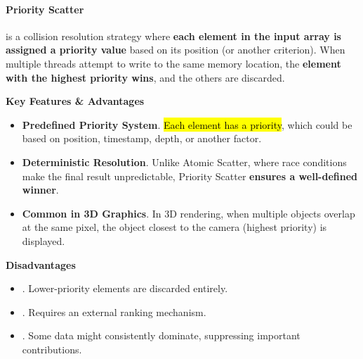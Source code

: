 \paragraph{Priority Scatter}

 is a collision resolution strategy where \textbf{each element in the input array is assigned a priority value} based on its position (or another criterion). When multiple threads attempt to write to the same memory location, the \textbf{element with the highest priority wins}, and the others are discarded.

\highspace
\begin{flushleft}
    \textcolor{Green3}{ \textbf{Key Features \& Advantages}}
\end{flushleft}
\begin{itemize}
    \item \textbf{Predefined Priority System}. \hl{Each element has a priority}, which could be based on position, timestamp, depth, or another factor.

    \item[\textcolor{Green3}{\faIcon{check}}] \textcolor{Green3}{\textbf{Deterministic Resolution}}. Unlike Atomic Scatter, where race conditions make the final result unpredictable, Priority Scatter \textbf{ensures a well-defined winner}.
    
    \item[\textcolor{Green3}{\faIcon{check}}] \textcolor{Green3}{\textbf{Common in 3D Graphics}}. In 3D rendering, when multiple objects overlap at the same pixel, the object closest to the camera (highest priority) is displayed.
\end{itemize}

\highspace
\begin{flushleft}
    \textcolor{Red2}{ \textbf{Disadvantages}}
\end{flushleft}
\begin{itemize}[label=\textcolor{Red2}{}]
    \item {}. Lower-priority elements are discarded entirely.
    \item {}. Requires an external ranking mechanism.
    \item {}. Some data might consistently dominate, suppressing important contributions.
\end{itemize}

